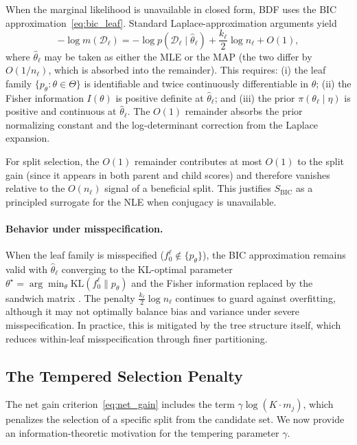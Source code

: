 \documentclass[twoside,11pt]{article}
\begin{document}
When the marginal likelihood is unavailable in closed form, BDF uses the BIC approximation~\eqref{eq:bic_leaf}. Standard Laplace-approximation arguments \citep{schwarz1978estimating,kass1995bayes} yield
\begin{equation}\label{eq:laplace_bic_theory}
-\log m(\mathcal{D}_\ell)
=
-\log p(\mathcal{D}_\ell\mid \hat{\theta}_\ell)
+
\frac{k_\ell}{2}\log n_\ell
+
O(1),
\end{equation}
where $\hat\theta_\ell$ may be taken as either the MLE or the MAP (the two differ by $O(1/n_\ell)$, which is absorbed into the remainder). This requires: (i) the leaf family $\{p_\theta : \theta \in \Theta\}$ is identifiable and twice continuously differentiable in $\theta$; (ii) the Fisher information $I(\theta)$ is positive definite at $\hat{\theta}_\ell$; and (iii) the prior $\pi(\theta_\ell \mid \eta)$ is positive and continuous at $\hat{\theta}_\ell$. The $O(1)$ remainder absorbs the prior normalizing constant and the log-determinant correction from the Laplace expansion.

For split selection, the $O(1)$ remainder contributes at most $O(1)$ to the split gain (since it appears in both parent and child scores) and therefore vanishes relative to the $O(n_\ell)$ signal of a beneficial split. This justifies $S_{\mathrm{BIC}}$ as a principled surrogate for the NLE when conjugacy is unavailable.

\paragraph{Behavior under misspecification.}
When the leaf family is misspecified ($f_0^\ell \notin \{p_\theta\}$), the BIC approximation remains valid with $\hat{\theta}_\ell$ converging to the KL-optimal parameter $\theta^\star = \arg\min_\theta \mathrm{KL}(f_0^\ell \| p_\theta)$ and the Fisher information replaced by the sandwich matrix \citep{white1982maximum}. The penalty $\frac{k_\ell}{2}\log n_\ell$ continues to guard against overfitting, although it may not optimally balance bias and variance under severe misspecification. In practice, this is mitigated by the tree structure itself, which reduces within-leaf misspecification through finer partitioning.


\subsection{The Tempered Selection Penalty}\label{subsec:theory_tempered}

The net gain criterion~\eqref{eq:net_gain} includes the term $\gamma \log(K \cdot m_j)$, which penalizes the selection of a specific split from the candidate set. We now provide an information-theoretic motivation for the tempering parameter $\gamma$.
\end{document}
